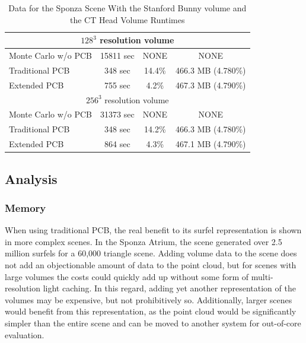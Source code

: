 \documentclass[runningheads]{llncs}
\begin{document}
\begin{table}
\begin{center}
\begin{tabular}{ | l | c | c | c | }
  \hline
  \multicolumn{4}{|c|}{$128^3$ resolution volume} \\     
  \hline            
             
  Monte Carlo w/o PCB & 15811 sec & NONE & NONE \\
  Traditional PCB & 348 sec & 14.4\% & 466.3 MB (4.780\%) \\
  Extended PCB & 755 sec & 4.2\% & 467.3 MB (4.790\%)  \\

  \hline
  \multicolumn{4}{|c|}{$256^3$ resolution volume} \\     
  \hline            
             
  Monte Carlo w/o PCB & 31373 sec & NONE & NONE \\
  Traditional PCB & 348 sec & 14.2\% & 466.3 MB (4.780\%) \\
  Extended PCB & 864 sec & 4.3\% & 467.1 MB (4.790\%)  \\
  \hline  
\end{tabular}
\caption{Data for the Sponza Scene With the Stanford Bunny volume and the CT Head Volume Runtimes}
\label{tb:comparison_head}
\end{center}
\end{table}


\subsection{Analysis}

\subsubsection{Memory}
When using traditional PCB, the real benefit to its surfel representation is shown in more complex scenes.  In the Sponza Atrium, the scene generated over 2.5 million surfels for a 60,000 triangle scene.  Adding volume data to the scene does not add an objectionable amount of data to the point cloud, but for scenes with large volumes the costs could quickly add up without some form of multi-resolution light caching.  In this regard, adding yet another representation of the volumes may be expensive, but not prohibitively so.  Additionally, larger scenes would benefit from this representation, as the point cloud would be significantly simpler than the entire scene and can be moved to another system for out-of-core evaluation.
\end{document}
